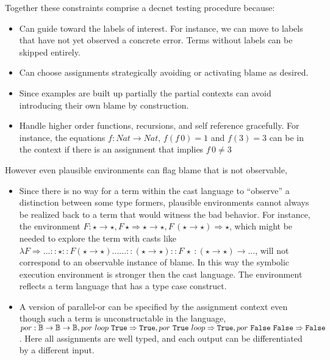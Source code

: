 Together these constraints comprise a decnet testing procedure because:
\begin{itemize}
\item Can guide toward the labels of interest.
For instance, we can move to labels that have not yet observed a concrete error.
Terms without labels can be skipped entirely.
\item Can choose assignments strategically avoiding or activating blame as desired.
\item Since examples are built up partially the partial contexts can avoid introducing their own blame by construction.
\item Handle higher order functions, recursions, and self reference gracefully.
For instance, the equations $f:Nat\rightarrow Nat$, $f\left(f\,0\right)=1$ and $f\left(3\right)=3$ can be in the context if there is an assignment that implies $f\,0\neq3$
\end{itemize}
  
  
  
 However even plausible environments can flag blame that is not observable,
 \begin{itemize}
 \item
 Since there is no way for a term within the cast language to ``observe'' a distinction between some type formers, plausible environments cannot always be realized back to a term that would witness the bad behavior.
 For instance, the environment $F:\star\rightarrow\star,F\,\star \Rightarrow \star\rightarrow\star,F\,\left(\star\rightarrow\star\right) \Rightarrow \star$, which might be needed to explore the term with casts like
  $\lambda F\Rightarrow...::\star::F\left(\star\rightarrow\star\right)......::\left(\star\rightarrow\star\right)::F\,\star\ :\left(\star\rightarrow\star\right)\rightarrow...$,
  will not correspond to an observable instance of blame.
 In this way the symbolic execution environment is stronger then the cast language.
 The environment reflects a term language that has a type case construct.
 \item
 A version of parallel-or can be specified by the assignment context even though such a term is unconstructable in the language, $por:\mathbb{B}\rightarrow\mathbb{B}\rightarrow\mathbb{B},por\ loop\ \True{} \Rightarrow  \True{}, por\ \True{} \ loop \Rightarrow \True{},por\ \False{}\ \False{} \Rightarrow  \False{}$.
 Here all assignments are well typed, and each output can be differentiated by a different input.
\end{itemize}
  

